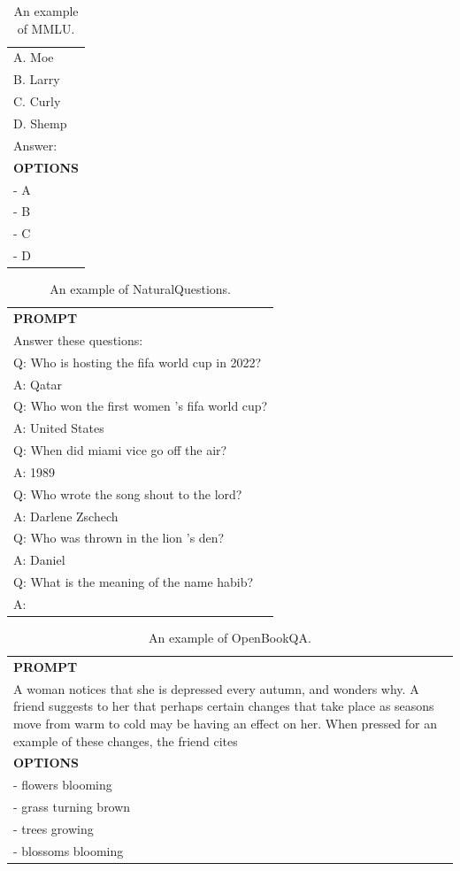 \begin{table}[h]
\begin{tabular}{p{12cm}}
A. Moe\\
B. Larry\\
C. Curly\\
D. Shemp\\
Answer:\\
\midrule
\textbf{OPTIONS}\\
- A\\
- B\\
- C\\
- D\\
\bottomrule
\end{tabular}
    \caption{\centering An example of MMLU.}
    \label{tab:mmlu_eval_format_example}
\end{table}

\begin{table}[h]
    \centering \small
\begin{tabular}{p{12cm}}
\toprule
\textbf{PROMPT}\\
Answer these questions:\\
Q: Who is hosting the fifa world cup in 2022?\\
A: Qatar\\
Q: Who won the first women 's fifa world cup?\\
A: United States\\
Q: When did miami vice go off the air?\\
A: 1989\\
Q: Who wrote the song shout to the lord?\\
A: Darlene Zschech\\
Q: Who was thrown in the lion 's den?\\
A: Daniel\\
Q: What is the meaning of the name habib?\\
A:\\
\bottomrule
\end{tabular}
    \caption{\centering An example of NaturalQuestions.}
    \label{tab:naturalquestions_eval_format_example}
\end{table}

\begin{table}[h]
    \centering \small
\begin{tabular}{p{12cm}}
\toprule
\textbf{PROMPT}\\
A woman notices that she is depressed every autumn, and wonders why. A friend suggests to her that perhaps certain changes that take place as seasons move from warm to cold may be having an effect on her. When pressed for an example of these changes, the friend cites\\
\midrule
\textbf{OPTIONS}\\
- flowers blooming\\
- grass turning brown\\
- trees growing\\
- blossoms blooming\\
\bottomrule
\end{tabular}
    \caption{\centering An example of OpenBookQA.}
    \label{tab:openbookqa_eval_format_example}
\end{table}

